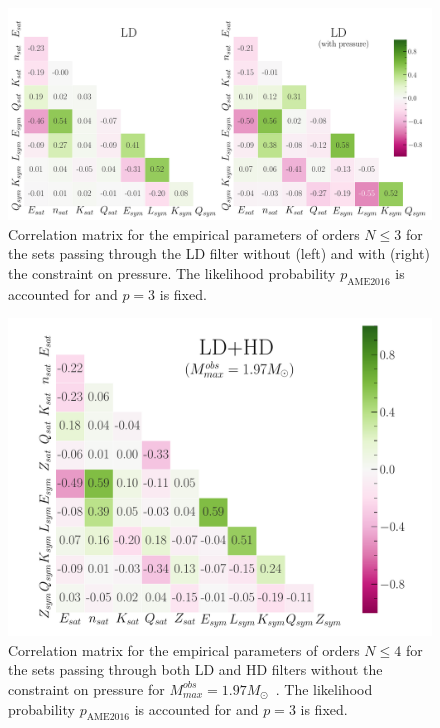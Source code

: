 \begin{figure}[!t]
\begin{center}
  \includegraphics[width=1.0\linewidth]{figures/cm_ld.pdf}
\end{center}
\caption[Correlations among empirical parameters for the sets passing through
the low-density filter]{Correlation matrix for the empirical parameters of 
  orders $N \leq 3$ for the sets passing through the LD filter without (left) 
  and with (right) the constraint on pressure. The likelihood probability 
$p_{\text{AME2016}}$ is accounted for and $p=3$ is fixed.}\label{fig:cm_ld}
\end{figure}
 
\begin{figure}[!t]
\begin{center}
  \includegraphics[width=0.9\linewidth]{figures/cm_ldhd.pdf}
\end{center}
\caption[Correlations among empirical parameters for the sets passing through
both low-density and high-density filters]{Correlation matrix for the empirical 
  parameters of orders $N \leq 4$ for the sets passing through both LD and HD 
  filters without the constraint on pressure for 
  $M_{max}^{obs}=1.97M_\odot$~\cite{Antoniadis2013}. The likelihood probability 
$p_{\text{AME2016}}$ is accounted for and $p=3$ is fixed.}\label{fig:cm_ldhd}
\end{figure}
 
